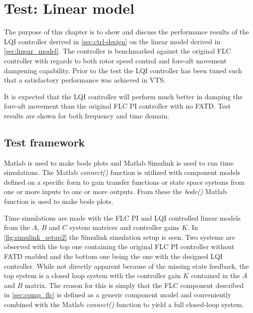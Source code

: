 \section{Test: Linear model} \label{sec:test_lin}
The purpose of this chapter is to show and discuss the performance results of the LQI controller derived in \cref{sec:ctrl-design} on the linear model derived in \cref{sec:linear_model}. The controller is benchmarked against the original FLC controller with regards to both rotor speed control and fore-aft movement dampening capability. Prior to the test the LQI controller has been tuned such that a satisfactory performance was achieved in VTS.

It is expected that the LQI controller will perform much better in damping the fore-aft movement than the original FLC PI controller with no FATD. Test results are shown for both frequency and time domain.


\subsection{Test framework}
Matlab is used to make bode plots and Matlab Simulink is used to run time simulations. The Matlab \textit{connect()} function is utilized with component models defined on a specific form to gain transfer functions or state space systems from one or more inputs to one or more outputs. From these the \textit{bode()} Matlab function is used to make bode plots. 

Time simulations are made with the FLC PI and LQI controlled linear models from the $ A $, $ B $ and $ C $ system matrices and controller gains $ K $. In \cref{fig:simulink_setup2} the Simulink simulation setup is seen. Two systems are observed with the top one containing the original FLC PI controller without FATD enabled and the bottom one being the one with the designed LQI controller. While not directly apparent because of the missing state feedback, the top system is a closed loop system with the controller gain $ K $ contained in the $ A $ and $ B $ matrix. The reason for this is simply that the FLC component described in \cref{sec:comp_flc} is defined as a generic component model and conveniently combined with the Matlab \textit{connect()} function to yield a full closed-loop system.

